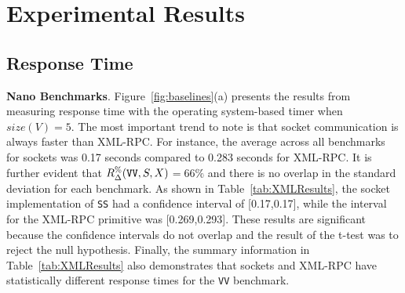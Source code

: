 \documentclass{sig-alternate}
\begin{document}
\vspace*{-.1in}
\section{Experimental Results}
\label{sec:results}

\subsection{Response Time}
\label{sec:time-overhead}




{\bf Nano Benchmarks}. Figure~\ref{fig:baselines}(a) presents the
results from measuring response time with the operating system-based
timer when $size(V)=5$.  The most important trend to note is that
socket communication is always faster than XML-RPC.  For instance, the
average across all benchmarks for sockets was 0.17 seconds compared to
0.283 seconds for XML-RPC.  It is further evident that {\small
  $R_\Delta^\%(\mbox{{\tt VV}},S,X)$}$ = 66\%$ and there is no overlap
in the standard deviation for each benchmark. As shown in
Table~\ref{tab:XMLResults}, the socket implementation of \texttt{SS}
had a confidence interval of [0.17,0.17], while the interval for the
XML-RPC primitive was [0.269,0.293].  These results are significant
because the confidence intervals do not overlap and the result of the
t-test was to reject the null hypothesis.  Finally, the summary
information in Table~\ref{tab:XMLResults} also demonstrates that
sockets and XML-RPC have statistically different response times for
the \texttt{VV} benchmark.

\end{document}
